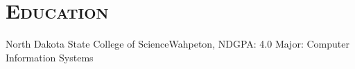 \documentclass[11pt,letter,roman]{moderncv} %
\begin{document}
\section{\textsc{Education}}
\label{sec:Education}
{North Dakota State College of Science}{Wahpeton, ND}{GPA: 4.0}
{Major: Computer Information Systems}
%
%
%
%




\end{document}
